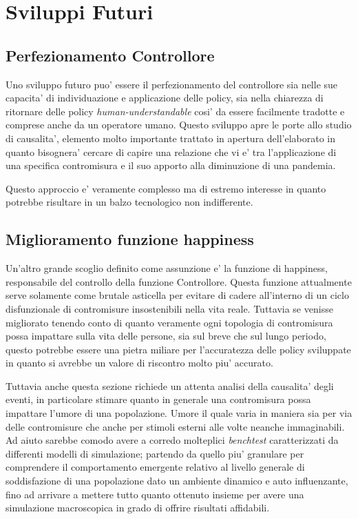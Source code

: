 \section{Sviluppi Futuri}
\subsection{Perfezionamento Controllore}
Uno sviluppo futuro puo' essere il perfezionamento del controllore sia nelle sue capacita' di individuazione
e applicazione delle policy, sia nella chiarezza di ritornare delle policy \emph{human-understandable} cosi' 
da essere facilmente tradotte e comprese anche da un operatore umano. Questo sviluppo apre le porte allo studio 
di causalita', elemento molto importante trattato in apertura dell'elaborato in quanto bisognera' cercare di capire 
una relazione che vi e' tra l'applicazione di una specifica contromisura e il suo apporto alla diminuzione di una 
pandemia. 

Questo approccio e' veramente complesso ma di estremo interesse in quanto potrebbe risultare in un balzo 
tecnologico non indifferente. 

\subsection{Miglioramento funzione happiness}
Un'altro grande scoglio definito come assunzione e' la funzione di happiness, responsabile del 
controllo della funzione Controllore. Questa funzione attualmente serve solamente come brutale asticella per evitare 
di cadere all'interno di un ciclo disfunzionale di contromisure insostenibili nella vita reale. Tuttavia 
se venisse migliorato tenendo conto di quanto veramente ogni topologia di contromisura possa impattare sulla vita 
delle persone, sia sul breve che sul lungo periodo, questo potrebbe essere una pietra miliare per l'accuratezza delle 
policy sviluppate in quanto si avrebbe un valore di riscontro molto piu' accurato. 

Tuttavia anche questa sezione richiede un attenta analisi della causalita' degli eventi, in particolare stimare quanto in 
generale una contromisura possa impattare l'umore di una popolazione. Umore il quale varia in maniera sia per via delle contromisure 
che anche per stimoli esterni alle volte neanche immaginabili. Ad aiuto sarebbe comodo avere a corredo molteplici \emph{benchtest} caratterizzati 
da differenti modelli di simulazione; partendo da quello piu' granulare per comprendere il comportamento emergente relativo 
al livello generale di soddisfazione di una popolazione dato un ambiente dinamico e auto influenzante, fino ad arrivare a mettere 
tutto quanto ottenuto insieme per avere una simulazione macroscopica in grado di offrire risultati affidabili.


